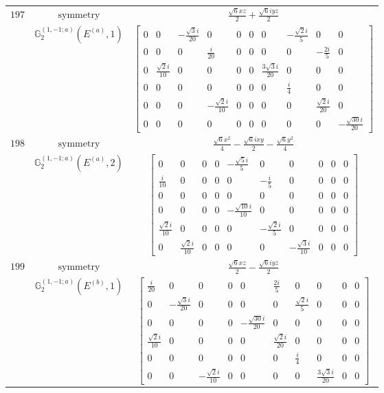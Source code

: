 \documentclass[fleqn,8pt,landscape]{jsarticle}
\begin{document}
\begin{longtable}{ccc}
$ 197 $ & $ \text{symmetry} $ & $ \frac{\sqrt{6} x z}{2} + \frac{\sqrt{6} i y z}{2} $ \\
$  $ & $ \mathbb{G}_{2}^{(1,-1;a)}(E^{(a)},1) $ & $ \begin{bmatrix} 0 & 0 & - \frac{\sqrt{3} i}{20} & 0 & 0 & 0 & 0 & - \frac{\sqrt{2} i}{5} & 0 & 0 \\ 0 & 0 & 0 & \frac{i}{20} & 0 & 0 & 0 & 0 & - \frac{2 i}{5} & 0 \\ 0 & \frac{\sqrt{2} i}{10} & 0 & 0 & 0 & 0 & \frac{3 \sqrt{3} i}{20} & 0 & 0 & 0 \\ 0 & 0 & 0 & 0 & 0 & 0 & 0 & \frac{i}{4} & 0 & 0 \\ 0 & 0 & 0 & - \frac{\sqrt{2} i}{10} & 0 & 0 & 0 & 0 & \frac{\sqrt{2} i}{20} & 0 \\ 0 & 0 & 0 & 0 & 0 & 0 & 0 & 0 & 0 & - \frac{\sqrt{30} i}{20} \end{bmatrix} $ \\ \hline
$ 198 $ & $ \text{symmetry} $ & $ \frac{\sqrt{6} x^{2}}{4} - \frac{\sqrt{6} i x y}{2} - \frac{\sqrt{6} y^{2}}{4} $ \\
$  $ & $ \mathbb{G}_{2}^{(1,-1;a)}(E^{(a)},2) $ & $ \begin{bmatrix} 0 & 0 & 0 & 0 & - \frac{\sqrt{5} i}{5} & 0 & 0 & 0 & 0 & 0 \\ \frac{i}{10} & 0 & 0 & 0 & 0 & - \frac{i}{5} & 0 & 0 & 0 & 0 \\ 0 & 0 & 0 & 0 & 0 & 0 & 0 & 0 & 0 & 0 \\ 0 & 0 & 0 & 0 & - \frac{\sqrt{10} i}{10} & 0 & 0 & 0 & 0 & 0 \\ \frac{\sqrt{2} i}{10} & 0 & 0 & 0 & 0 & - \frac{\sqrt{2} i}{5} & 0 & 0 & 0 & 0 \\ 0 & \frac{\sqrt{2} i}{10} & 0 & 0 & 0 & 0 & - \frac{\sqrt{3} i}{10} & 0 & 0 & 0 \end{bmatrix} $ \\ \hline
$ 199 $ & $ \text{symmetry} $ & $ \frac{\sqrt{6} x z}{2} - \frac{\sqrt{6} i y z}{2} $ \\
$  $ & $ \mathbb{G}_{2}^{(1,-1;a)}(E^{(b)},1) $ & $ \begin{bmatrix} \frac{i}{20} & 0 & 0 & 0 & 0 & \frac{2 i}{5} & 0 & 0 & 0 & 0 \\ 0 & - \frac{\sqrt{3} i}{20} & 0 & 0 & 0 & 0 & \frac{\sqrt{2} i}{5} & 0 & 0 & 0 \\ 0 & 0 & 0 & 0 & - \frac{\sqrt{30} i}{20} & 0 & 0 & 0 & 0 & 0 \\ \frac{\sqrt{2} i}{10} & 0 & 0 & 0 & 0 & \frac{\sqrt{2} i}{20} & 0 & 0 & 0 & 0 \\ 0 & 0 & 0 & 0 & 0 & 0 & \frac{i}{4} & 0 & 0 & 0 \\ 0 & 0 & - \frac{\sqrt{2} i}{10} & 0 & 0 & 0 & 0 & \frac{3 \sqrt{3} i}{20} & 0 & 0 \end{bmatrix} $ \\ \hline

\end{longtable}
\end{document}
